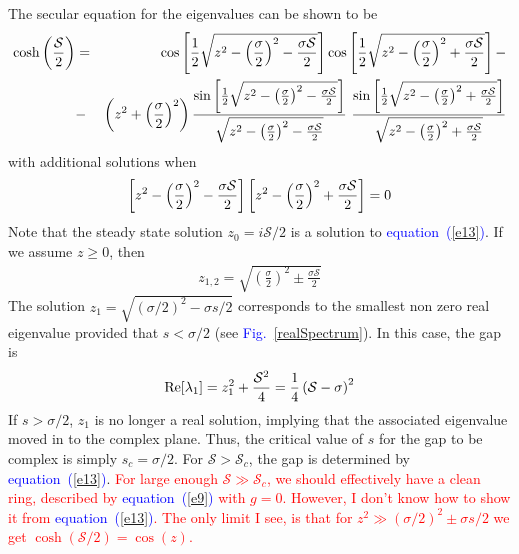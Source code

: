 \documentclass[aps,pre,floats,floatfix,fleqn,notitlepage]{revtex4-1}
\newcommand{\mylabel}[1]{\label{#1}}  %
\newcommand{\beq}{\begin{eqnarray}}
\newcommand{\eeq}{\end{eqnarray}}
\newcommand{\be}[1]{\begin{eqnarray}\ifthenelse{#1=-1}{\nonumber}{\ifthenelse{#1=0}{}{\mylabel{e#1}}}}
\newcommand{\ee}{\end{eqnarray}}
\newcommand{\Eq}[1]{\textcolor{blue}{equation~(\ref{#1})}} %
\newcommand{\Fig}[1] {\textcolor{blue}{Fig.~\ref{#1}}} %
\newcommand{\rmrk}[1]{\textcolor{red}{#1}}
\begin{document}
The secular equation for the eigenvalues can be shown to be 
%
\be{13}
\cosh\left(\frac{\mathcal{S}}{2}\right) &=&
\cos\left[\frac{1}{2}\sqrt{z^2-\left(\frac{\sigma}{2}\right)^2 - \frac{\sigma \mathcal{S}}{2}}\right]
\cos\left[\frac{1}{2}\sqrt{z^2-\left(\frac{\sigma}{2}\right)^2 + \frac{\sigma \mathcal{S}}{2}}\right]-\\
&-&\left(z^2+\left(\frac{\sigma}{2}\right)^2\right)
\frac{\sin\left[\frac{1}{2}\sqrt{z^2-\left(\frac{\sigma}{2}\right)^2 - \frac{\sigma \mathcal{S}}{2}}\right]}{\sqrt{z^2-\left(\frac{\sigma}{2}\right)^2 - \frac{\sigma \mathcal{S}}{2}}}\
\frac{\sin\left[\frac{1}{2}\sqrt{z^2-\left(\frac{\sigma}{2}\right)^2 +\frac{\sigma \mathcal{S}}{2}}\right]}{\sqrt{z^2-\left(\frac{\sigma}{2}\right)^2 + \frac{\sigma \mathcal{S}}{2}}}  \nonumber
\ee
%
with additional solutions when
%
\be{14}
\left[z^2-\left(\frac{\sigma}{2}\right)^2 - \frac{\sigma \mathcal{S}}{2}\right]
\left[z^2-\left(\frac{\sigma}{2}\right)^2 + \frac{\sigma \mathcal{S}}{2} \right] =0
\ee
%
Note that the steady state solution $z_0=i\mathcal{S}/2$ is a solution to \Eq{e13}.
If we assume $z\geq 0$, then
%
\beq
z_{1,2} =  \sqrt{ \left(\frac{\sigma}{2}\right)^2 \pm \frac{\sigma \mathcal{S}}{2}   }
\eeq
%
The solution $z_1=\sqrt{(\sigma/2)^2 - \sigma s/2}$  corresponds to the smallest non zero real eigenvalue provided that $s<\sigma/2$ (see \Fig{realSpectrum}).
In this case, the gap is 
%
\be{15}
\text{Re}[\lambda_1]= z_1^2 + \frac{\mathcal{S}^2}{4} = \frac{1}{4}\left(\mathcal{S}-\sigma \right)^2
\ee
%
 If $s>\sigma/2$, $z_1$ is no longer a real solution, implying that the associated eigenvalue moved in to the complex plane. Thus, the critical value of $s$ for the gap to be complex is simply $s_c=\sigma/2$.
 For $\mathcal{S}>\mathcal{S}_c$, the gap is determined by \Eq{e13}. 
\rmrk{ For large enough $\mathcal{S}\gg \mathcal{S}_c$, 
 we should effectively have a clean ring, described by \Eq{e9} with $g=0$. However, I don't know how to show it from \Eq{e13}. The only limit I see, is that for ${z^2\gg (\sigma/2)^2 \pm \sigma s/2}$ we get 
 ${\cosh(\mathcal{S}/2)=\cos(z)}$.}
\end{document}
